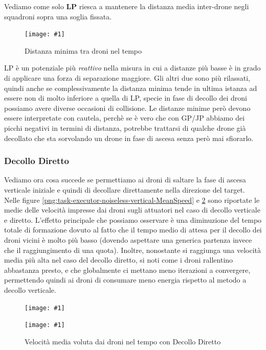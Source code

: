 \documentclass[a4paper,11pt,oneside, table]{article}
\newcommand{\putimage}[4] {
	\begin{figure}[H]
	    \centering
	    \texttt{[image: \#1]}
	    \caption{#2}\label{#3}
	\end{figure}
}
\newcommand{\putsubimage}[5] {
  \begin{minipage}{{#4}\linewidth}
	    \centering
      \texttt{[image: \#1]}
	    \caption{#2}\label{#3}
	\end{minipage}
}
\newcommand{\putimagecouple}[2] {
  \begin{figure}[!htb]
      \centering
      #1
      \hspace{0.5cm}
      #2
  \end{figure}
}
\begin{document}
Vediamo come solo \textbf{LP} riesca a mantenere la distanza media inter-drone negli squadroni sopra una soglia fissata.

\putimage{images/experiments/task-executor-noiseless-vertical/MinDistancesGlobally.png}{Distanza minima tra droni nel tempo}{png:task-executor-noiseless-vertical-MinDistancesGlobally}{0.99}

LP \`e un potenziale pi\`u \textit{reattivo} nella misura in cui a distanze pi\`u basse \`e in grado di applicare una forza di separazione maggiore. Gli altri due sono pi\`u rilassati, quindi anche se complessivamente la distanza minima tende in ultima istanza ad essere non di molto inferiore a quella di LP, specie in fase di decollo dei droni possiamo avere diverse occasioni di collisione.
Le distanze minime per\`o devono essere interpretate con cautela, perch\`e se \`e vero che con GP/JP abbiamo dei picchi negativi in termini di distanza, potrebbe trattarsi di qualche drone gi\`a decollato che sta sorvolando un drone in fase di ascesa senza per\`o mai sfiorarlo.

\subsubsection{Decollo Diretto}

Vediamo ora cosa succede se permettiamo ai droni di saltare la fase di ascesa verticale iniziale e quindi di decollare direttamente nella direzione del target.
Nelle figure \ref{png:task-executor-noiseless-vertical-MeanSpeed} e \ref{png:task-executor-noiseless-direct-MeanSpeed} sono riportate le medie delle velocit\`a impresse dai droni sugli attuatori nel caso di decollo verticale e diretto.
L'effetto principale che possiamo osservare \`e una diminuzione del tempo totale di formazione dovuto al fatto che il tempo medio di attesa per il decollo dei droni vicini \`e molto pi\`u basso (dovendo aspettare una generica partenza invece che il raggiungimento di una quota).
Inoltre, nonostante si raggiunga una velocit\`a media pi\`u alta nel caso del decollo diretto, si noti come i droni rallentino abbastanza presto, e che globalmente ci mettano meno iterazioni a convergere, permettendo quindi ai droni di consumare meno energia rispetto al metodo a decollo verticale.

\putimagecouple
{\putsubimage{images/experiments/task-executor-noiseless-vertical/MeanSpeed.png}{Velocit\`a media voluta dai droni nel tempo con Decollo Verticale}{png:task-executor-noiseless-vertical-MeanSpeed}{0.4}{0.99}}
{\putsubimage{images/experiments/task-executor-noiseless-direct/MeanSpeed.png}{Velocit\`a media voluta dai droni nel tempo con Decollo Diretto}{png:task-executor-noiseless-direct-MeanSpeed}{0.4}{0.99}}
\end{document}
